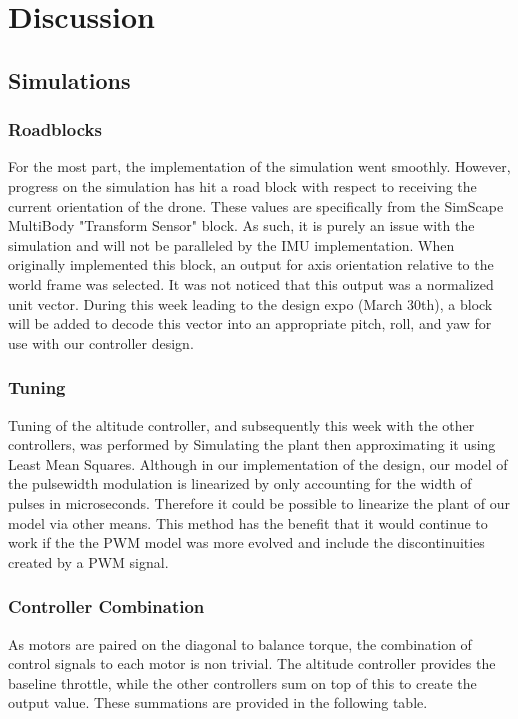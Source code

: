 
\section{Discussion}
\subsection{Simulations}
\label{discussion:sim}
\subsubsection{Roadblocks}
For the most part, the implementation of the simulation went smoothly.  However, progress on the simulation has hit a road block with respect to receiving the current orientation of the drone.  These values are specifically from the SimScape MultiBody "Transform Sensor" block.  As such, it is purely an issue with the simulation and will not be paralleled by the IMU implementation.  When originally implemented this block, an output for axis orientation relative to the world frame was selected.  It was not noticed that this output was a normalized unit vector.  During this week leading to the design expo (March 30th), a block will be added to decode this vector into an appropriate pitch, roll, and yaw for use with our controller design.  

\subsubsection{Tuning}
Tuning of the altitude controller, and subsequently this week with the other controllers, was performed by Simulating the plant then approximating it using Least Mean Squares.  Although in our implementation of the design, our model of the pulsewidth modulation is linearized by only accounting for the width of pulses in microseconds.  Therefore it could be possible to linearize the plant of our model via other means.  This method has the benefit that it would continue to work if the the PWM model was more evolved and include the discontinuities created by a PWM signal.

\subsubsection{Controller Combination}
As motors are paired on the diagonal to balance torque, the combination of control signals to each motor is non trivial.  The altitude controller provides the baseline throttle, while the other controllers sum on top of this to create the output value.  These summations are provided in the following table.


